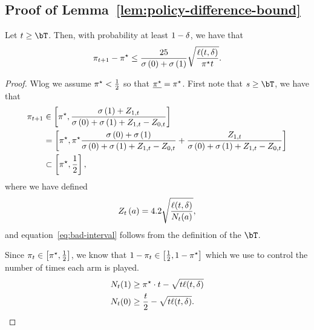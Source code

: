     \subsection{Proof of Lemma~\ref{lem:policy-difference-bound}}
        \begin{lemma}\label{lem:concentration-policy-diff}
            Let $\round \geq \exploreTime$. Then, with probability at least $1 - \delta$, we have that
            \begin{equation}
                \policy_{\round + 1} - \neymanPolicy \leq \frac{25}{\stdev[\cidx] + \stdev[\tidx]}\sqrt{\frac{\ell(\round, \errorProb)}{\neymanPolicy \round}}.
            \end{equation}
        \end{lemma}
        \begin{proof}
        Wlog we assume $\neymanPolicy < \frac{1}{2}$ so that $\minNeymanPolicy = \neymanPolicy$.
        First note that \(\timeidx \geq \exploreTime\), we have that 
        \begin{align}
            \policy_{\round + 1} &\in \sbrk{
            \neymanPolicy, 
            \frac{\stdev[\tidx] + \confWidth_{\tidx, \round}}
                {\stdev[\cidx] + \stdev[\tidx] + \confWidth_{\tidx, \round} - \confWidth_{\cidx, \round}}
            } \\
            &= \sbrk{
            \neymanPolicy, 
            \neymanPolicy\frac{\stdev[\cidx] + \stdev[\tidx]}
                {\stdev[\cidx] + \stdev[\tidx] + \confWidth_{\tidx, \round} - \confWidth_{\cidx, \round}}
            + \frac{\confWidth_{\tidx, \round}}
                {\stdev[\cidx] + \stdev[\tidx] + \confWidth_{\tidx, \round} - \confWidth_{\cidx, \round}}
            }\label{eq:policy-cs-width} \\
            &\subset \sbrk{\neymanPolicy, \frac{1}{2}} \label{eq:bad-interval},
        \end{align}
        where we have defined 
        \begin{equation*}
            \confWidth[\round][\aidx] = 4.2 \sqrt{\frac{\ell(\round, \errorProb)}{\acount{\round}{\aidx}}},
        \end{equation*}
        and equation~\eqref{eq:bad-interval} follows from the definition of the $\exploreTime$.
        
        Since $\policy_\round \in \sbrk{\neymanPolicy,\frac{1}{2}}$, we know that $1 - \policy_\round \in \sbrk{\frac{1}{2}, 1 - \neymanPolicy}$ which we use to control the number of times each arm is played.
        \begin{align}
            \acount{\round}{\tidx} &\geq \neymanPolicy \cdot \round - \sqrt{\round \ell(\round, \errorProb)} \\
            \acount{\round}{\cidx} &\geq \frac{\round}{2} - \sqrt{\round \ell(\round, \errorProb)}.
        \end{align}
        

\end{proof}
